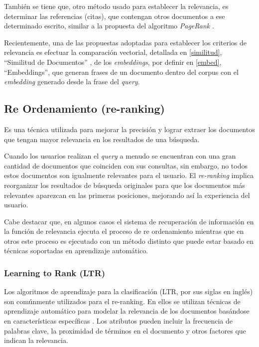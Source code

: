 \documentclass[
  12pt,
  openany]{book}
\begin{document}
También se tiene que, otro método usado para establecer la relevancia, es determinar las referencias (citas), que contengan otros documentos a ese determinado escrito, similar a la propuesta del algoritmo \emph{PageRank} \citep{brin1998}.

Recientemente, una de las propuestas adoptadas para establecer los criterios de relevancia es efectuar la comparación vectorial, detallada en \ref{similitud}, ``Similitud de Documentos'' , de los \emph{embeddings}, por definir en \ref{embed}, ``Embeddings'', que generan frases de un documento dentro del corpus con el \emph{embedding} generado desde la frase del \emph{query}.

\hypertarget{ranking}{%
\subsection{Re Ordenamiento (re-ranking)}\label{ranking}}

Es una técnica utilizada para mejorar la precisión y lograr extraer los documentos que tengan mayor relevancia en los resultados de una búsqueda.

Cuando los usuarios realizan el \emph{query} a menudo se encuentran con una gran cantidad de documentos que coinciden con sus consultas, sin embargo, no todos estos documentos son igualmente relevantes para el usuario. El \emph{re-ranking} implica reorganizar los resultados de búsqueda originales para que los documentos más relevantes aparezcan en las primeras posiciones, mejorando así la experiencia del usuario.

Cabe destacar que, en algunos casos el sistema de recuperación de información en la función de relevancia ejecuta el proceso de re ordenamiento mientras que en otros este proceso es ejecutado con un método distinto que puede estar basado en técnicas soportadas en aprendizaje automático.

\hypertarget{learning-to-rank-ltr}{%
\subsubsection{Learning to Rank (LTR)}\label{learning-to-rank-ltr}}

Los algoritmos de aprendizaje para la clasificación (LTR, por sus siglas en inglés) son comúnmente utilizados para el re-ranking. En ellos se utilizan técnicas de aprendizaje automático para modelar la relevancia de los documentos basándose en características específicas \citep{büttcher2010}. Los atributos pueden incluir la frecuencia de palabras clave, la proximidad de términos en el documento y otros factores que indican la relevancia.
\end{document}
